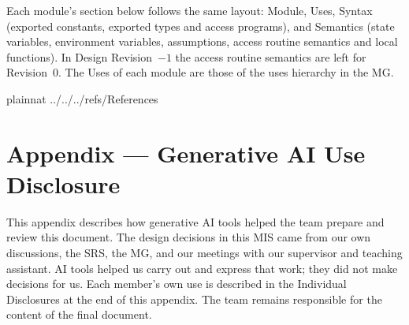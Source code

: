 \documentclass[12pt, titlepage]{article}
\begin{document}
Each module's section below follows the same layout: Module, Uses, Syntax
(exported constants, exported types and access programs), and Semantics (state variables,
environment variables, assumptions, access routine semantics and local
functions). In Design Revision~$-1$ the access routine semantics are left for
Revision~0. The Uses of each module are those of the uses hierarchy in the MG.

\newpage



























\newpage

 {plainnat}
 {../../../refs/References}

\newpage

\newpage{}

\section{Appendix --- Generative AI Use Disclosure}

This appendix describes how generative AI tools helped the team prepare and
review this document. The design decisions in this MIS came from our own
discussions, the SRS, the MG, and our meetings with our supervisor and teaching
assistant. AI tools helped us carry out and express that work; they did not
make decisions for us. Each member's own use is described in the Individual
Disclosures at the end of this appendix. The team remains responsible for the
content of the final document.
\end{document}
